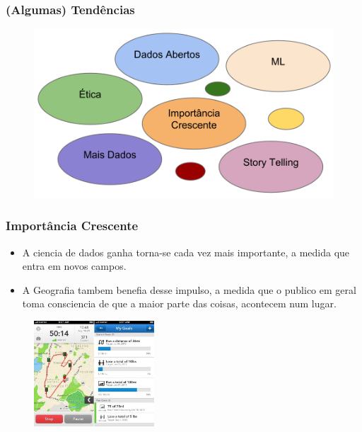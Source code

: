 \documentclass[hyperref={pdfpagelabels=true}]{beamer}
\begin{document}
\begin{frame}
\frametitle{(Algumas) Tend\^{e}ncias}

    \begin{figure}   
         \includegraphics[width=\textwidth]{trends.png}   
    \end{figure}     

\end{frame}

\begin{frame}
\frametitle{Import\^{a}ncia Crescente}

      \begin{itemize}    %
        \item<1->A ciencia de dados ganha torna-se cada vez mais importante, a medida que entra em novos campos.%
        \item<2->A Geografia tambem benefia desse impulso, a medida que o publico em geral toma consciencia de que a maior parte das coisas, acontecem num lugar.
      \end{itemize}                
      
    \begin{figure}   
         \includegraphics[width=0.4\textwidth]{runkeeper.jpg}   
    \end{figure} 

\end{frame}
\end{document}

